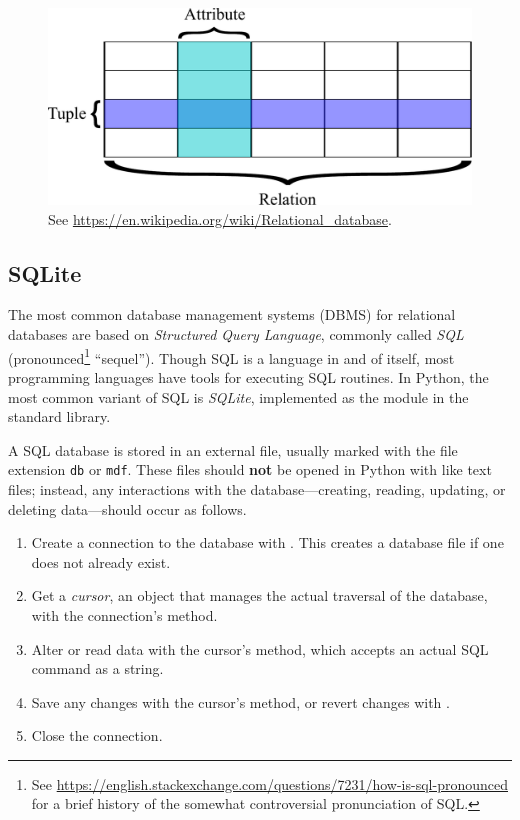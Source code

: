 \begin{figure}[H]
    \centering
    \includegraphics[width=.7\textwidth]{rdb_table.pdf}
    \caption{See \url{https://en.wikipedia.org/wiki/Relational_database}.}
    \label{fig:sql-relation}
\end{figure}

\subsection*{SQLite} %

The most common database management systems (DBMS) for relational databases are based on \emph{Structured Query Language}, commonly called \emph{SQL} (pronounced\footnote{See \url{https://english.stackexchange.com/questions/7231/how-is-sql-pronounced} for a brief history of the somewhat controversial pronunciation of SQL.} ``sequel'').
Though SQL is a language in and of itself, most programming languages have tools for executing SQL routines.
In Python, the most common variant of SQL is \emph{SQLite}, implemented as the  module in the standard library.

A SQL database is stored in an external file, usually marked with the file extension \texttt{db} or \texttt{mdf}.
These files should \textbf{not} be opened in Python with  like text files; instead, any interactions with the database---creating, reading, updating, or deleting data---should occur as follows.

\begin{enumerate}
    \item Create a connection to the database with .
    This creates a database file if one does not already exist.
    \item Get a \emph{cursor}, an object that manages the actual traversal of the database, with the connection's  method.
    \item Alter or read data with the cursor's  method, which accepts an actual SQL command as a string.
    \item Save any changes with the cursor's  method, or revert changes with .
    \item Close the connection.
\end{enumerate}

